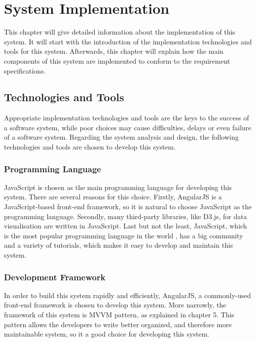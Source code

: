 
\chapter{System Implementation} \label{Chapter:System Implementation}

This chapter will give detailed information about the implementation of this system. It will start with the introduction of the implementation technologies and tools for this system. Afterwards, this chapter will explain how the main components of this system are implemented to conform to the requirement specifications.


\section{Technologies and Tools
}
Appropriate implementation technologies and tools are the keys to the success of a software system, while poor choices may cause difficulties, delays or even failure of a software system. Regarding the system analysis and design, the following technologies and tools are chosen to develop this system. 



\subsection{Programming Language}

JavaScript is chosen as the main programming language for developing this system. There are several reasons for this choice. Firstly, AngularJS is a JavaScript-based front-end framework, so it is natural to choose JavaScript as the programming language. Secondly, many third-party libraries, like D3.js, for data visualisation are written in JavaScript. Last but not the least, JavaScript, which is the most popular programming language in the world \cite{ARC}, has a big community and a variety of tutorials, which makes it easy to develop and maintain this system. 


\subsection{Development Framework}

In order to build this system rapidly and efficiently, AngularJS, a commonly-used front-end framework is chosen to develop this system. More narrowly, the framework of this system is MVVM pattern, as explained in chapter 5. This pattern allows the developers to write better organized, and therefore more maintainable system, so it a good choice for developing this system.

